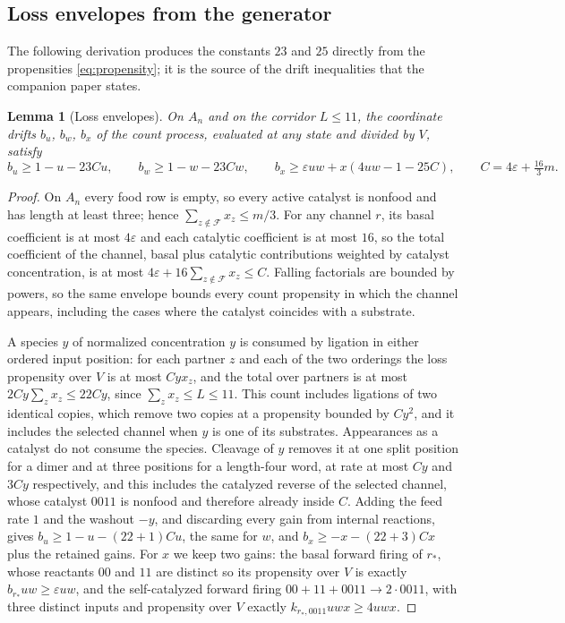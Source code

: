\documentclass[11pt,letterpaper]{article}
\theoremstyle{plain}
\newtheorem{lemma}[theorem]{Lemma}
\theoremstyle{definition}
\theoremstyle{remark}
\numberwithin{equation}{section}
\newcommand{\cF}{\mathcal F}
\newcommand{\eps}{\varepsilon}
\begin{document}
\subsection{Loss envelopes from the generator}\label{sec:envelopes}
The following derivation produces the constants $23$ and $25$ directly from the propensities \eqref{eq:propensity}; it is the source of the drift inequalities that the companion paper \cite{structural2026} states.

\begin{lemma}[Loss envelopes]\label{lem:envelopes}
On $A_n$ and on the corridor $L\le11$, the coordinate drifts $b_u$, $b_w$, $b_x$ of the count process, evaluated at any state and divided by $V$, satisfy
\begin{equation}\label{eq:drifts}
 b_u\ge1-u-23Cu,\qquad b_w\ge1-w-23Cw,\qquad b_x\ge\eps uw+x(4uw-1-25C),\qquad
 C=4\eps+\tfrac{16}3m .
\end{equation}
\end{lemma}
\begin{proof}
On $A_n$ every food row is empty, so every active catalyst is nonfood and has length at least three; hence $\sum_{z\notin\cF}x_z\le m/3$. For any channel $r$, its basal coefficient is at most $4\eps$ and each catalytic coefficient is at most $16$, so the total coefficient of the channel, basal plus catalytic contributions weighted by catalyst concentration, is at most $4\eps+16\sum_{z\notin\cF}x_z\le C$. Falling factorials are bounded by powers, so the same envelope bounds every count propensity in which the channel appears, including the cases where the catalyst coincides with a substrate.

A species $y$ of normalized concentration $y$ is consumed by ligation in either ordered input position: for each partner $z$ and each of the two orderings the loss propensity over $V$ is at most $Cyx_z$, and the total over partners is at most $2Cy\sum_zx_z\le22Cy$, since $\sum_zx_z\le L\le11$. This count includes ligations of two identical copies, which remove two copies at a propensity bounded by $Cy^2$, and it includes the selected channel when $y$ is one of its substrates. Appearances as a catalyst do not consume the species. Cleavage of $y$ removes it at one split position for a dimer and at three positions for a length-four word, at rate at most $Cy$ and $3Cy$ respectively, and this includes the catalyzed reverse of the selected channel, whose catalyst $0011$ is nonfood and therefore already inside $C$. Adding the feed rate $1$ and the washout $-y$, and discarding every gain from internal reactions, gives $b_u\ge1-u-(22+1)Cu$, the same for $w$, and $b_x\ge-x-(22+3)Cx$ plus the retained gains. For $x$ we keep two gains: the basal forward firing of $r_*$, whose reactants $00$ and $11$ are distinct so its propensity over $V$ is exactly $b_{r_*}uw\ge\eps uw$, and the self-catalyzed forward firing $00+11+0011\to2\cdot0011$, with three distinct inputs and propensity over $V$ exactly $k_{r_*,0011}uwx\ge4uwx$.
\end{proof}
\end{document}
